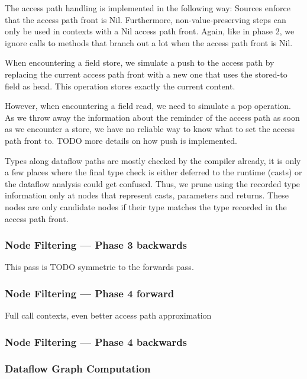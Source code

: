 The access path handling is implemented in the following way:
Sources enforce that the access path front is Nil.
Furthermore, non-value-preserving steps can only be used in contexts with
a Nil access path front.
Again, like in phase 2, we ignore calls to methods that branch out a lot when the
access path front is Nil.

When encountering a field store, we simulate a push to the access path by replacing 
the current access path front with a new one that uses the stored-to field 
as head.
This operation stores exactly the current content.

However, when encountering a field read, we need to simulate a pop operation.
As we throw away the information about the reminder of the access path as soon as 
we encounter a store, we have no reliable way to know what to set the access path front 
to.
TODO more details on how push is implemented.

Types along dataflow paths are mostly checked by the compiler already, it is 
only a few places where the final type check is either deferred to the runtime 
(casts) or the dataflow analysis could get confused.
Thus, we prune using the recorded type information only at nodes that represent 
casts, parameters and returns.
These nodes are only candidate nodes if their type 
matches the type recorded in the access path front.

\subsubsection*{Node Filtering --- Phase 3 backwards}
This pass is TODO symmetric to the forwards pass.
\subsubsection*{Node Filtering --- Phase 4 forward}
Full call contexts, even better access path approximation 
\subsubsection*{Node Filtering --- Phase 4 backwards}

\subsubsection*{Dataflow Graph Computation}



